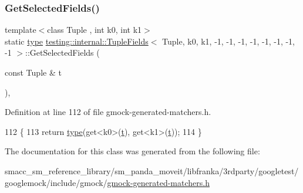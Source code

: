 \subsubsection{\texorpdfstring{Get\+Selected\+Fields()}{GetSelectedFields()}}
{\footnotesize\ttfamily template$<$class Tuple , int k0, int k1$>$ \\
static \hyperlink{classtesting_1_1internal_1_1TupleFields_3_01Tuple_00_01k0_00_01k1_00_01-1_00_01-1_00_01-1_00_01-fb5812c507091ce72ac353453b83394d_ad0dd4e84d48ec9a5ef262cf32f6979f9}{type} \hyperlink{classtesting_1_1internal_1_1TupleFields}{testing\+::internal\+::\+Tuple\+Fields}$<$ Tuple, k0, k1, -\/1, -\/1, -\/1, -\/1, -\/1, -\/1, -\/1, -\/1 $>$\+::Get\+Selected\+Fields (\begin{DoxyParamCaption}\item[{const Tuple \&}]{t }\end{DoxyParamCaption})\hspace{0.3cm}{\ttfamily [inline]}, {\ttfamily [static]}}



Definition at line 112 of file gmock-\/generated-\/matchers.\+h.


\begin{DoxyCode}
112                                                 \{
113     \textcolor{keywordflow}{return} \hyperlink{classtesting_1_1internal_1_1TupleFields_3_01Tuple_00_01k0_00_01k1_00_01-1_00_01-1_00_01-1_00_01-fb5812c507091ce72ac353453b83394d_ad0dd4e84d48ec9a5ef262cf32f6979f9}{type}(get<k0>(\hyperlink{namespacebattery__monitor__node_a7a63d20d1ea461e280f4eb5b47f925cd}{t}), get<k1>(\hyperlink{namespacebattery__monitor__node_a7a63d20d1ea461e280f4eb5b47f925cd}{t}));
114   \}
\end{DoxyCode}


The documentation for this class was generated from the following file\+:\begin{DoxyCompactItemize}
\item 
smacc\+\_\+sm\+\_\+reference\+\_\+library/sm\+\_\+panda\+\_\+moveit/libfranka/3rdparty/googletest/googlemock/include/gmock/\hyperlink{gmock-generated-matchers_8h}{gmock-\/generated-\/matchers.\+h}\end{DoxyCompactItemize}
